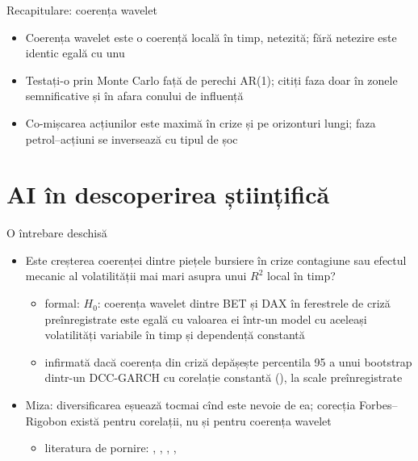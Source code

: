 \begin{frame}{Recapitulare: coerența wavelet}
\itemsize{\small}
\begin{itemize}
    \item Coerența wavelet este o coerență locală în timp, netezită; fără netezire este identic egală cu unu
    \item Testați-o prin Monte Carlo față de perechi AR(1); citiți faza doar în zonele semnificative și în afara conului de influență
    \item Co-mișcarea acțiunilor este maximă în crize și pe orizonturi lungi; faza petrol--acțiuni se inversează cu tipul de șoc
\end{itemize}
\end{frame}


\section{AI în descoperirea științifică}

\begin{frame}{O întrebare deschisă}
\itemsize{\small}
\begin{itemize}
    \item Este creșterea coerenței dintre piețele bursiere în crize contagiune sau efectul mecanic al volatilității mai mari asupra unui $R^2$ local în timp?
    \begin{itemize}
        \item formal: $H_0$: coerența wavelet dintre BET și DAX în ferestrele de criză preînregistrate este egală cu valoarea ei într-un model cu aceleași volatilități variabile în timp și dependență constantă
        \item infirmată dacă coerența din criză depășește percentila 95 a unui bootstrap dintr-un DCC-GARCH cu corelație constantă (), la scale preînregistrate
    \end{itemize}
    \item Miza: diversificarea eșuează tocmai cînd este nevoie de ea; corecția Forbes--Rigobon există pentru corelații, nu și pentru coerența wavelet
    \begin{itemize}
        \item literatura de pornire: , , , , 
    \end{itemize}
\end{itemize}
\end{frame}

